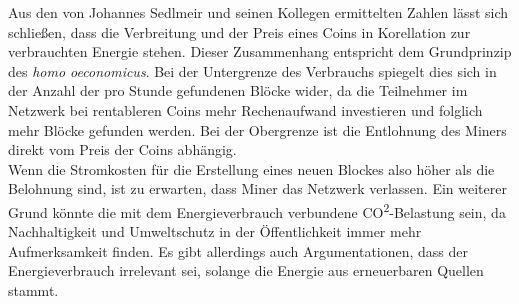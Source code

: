 Aus den von Johannes Sedlmeir und seinen Kollegen ermittelten Zahlen lässt sich schließen, dass die Verbreitung und der Preis eines Coins in Korellation zur verbrauchten Energie stehen. Dieser Zusammenhang entspricht dem Grundprinzip des \textit{homo oeconomicus}. Bei der Untergrenze des Verbrauchs spiegelt dies sich in der Anzahl der pro Stunde gefundenen Blöcke wider, da die Teilnehmer im Netzwerk bei rentableren Coins mehr Rechenaufwand investieren und folglich mehr Blöcke gefunden werden. Bei der Obergrenze ist die Entlohnung des Miners direkt vom Preis der Coins abhängig.\\
Wenn die Stromkosten für die Erstellung eines neuen Blockes also höher als die Belohnung sind, ist zu erwarten, dass Miner das Netzwerk verlassen. Ein weiterer Grund könnte die mit dem Energieverbrauch verbundene CO\textsuperscript{2}-Belastung sein, da Nachhaltigkeit und Umweltschutz in der Öffentlichkeit immer mehr Aufmerksamkeit finden. Es gibt allerdings auch Argumentationen, dass der Energieverbrauch irrelevant sei, solange die Energie aus erneuerbaren Quellen stammt.